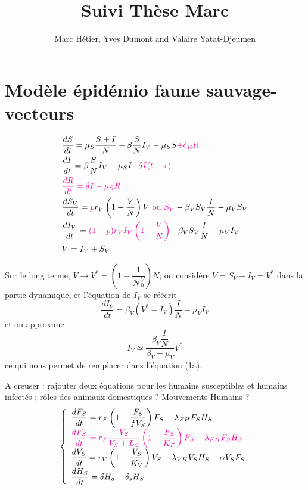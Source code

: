 \documentclass{article}
\title{Suivi Thèse Marc}
\author{Marc Hétier, Yves Dumont  and Valaire Yatat-Djeumen}
\newcommand{\marc}{\textcolor{magenta}}
\newcommand{\lf}{\lambda_{FH}}
\newcommand{\lv}{\lambda_{VH}}
\begin{document}
\maketitle

\section{Modèle épidémio faune sauvage-vecteurs}
\begin{subequations}
\begin{align}
&\dfrac{dS}{dt} = \mu_S \dfrac{S+I}{N} - \beta \dfrac{S}{N}I_V - \mu_S S \marc{+ \delta_R R}\\
&\dfrac{dI}{dt} = \beta \dfrac{S}{N}I_V - \mu_S I \marc{-\delta I(t-\tau)} \\
&\marc{\dfrac{dR}{dt} = \delta I - \mu_S R} \\
&\dfrac{dS_V}{dt} = \marc{p} r_V \left(1 - \dfrac{V}{N}\right)V \marc{\text{ ou } S_V} - \beta_V S_V \dfrac{I}{N} - \mu_V S_V \\
&\dfrac{dI_V}{dt} = \marc{(1-p) r_V I_V \left(1-\dfrac{V}{N} \right) + } \beta_V S_V \dfrac{I}{N} - \mu_V I_V \\
& V = I_V + S_V
\end{align}
\end{subequations}

Sur le long terme, $V \rightarrow V^* = (1-\dfrac{1}{\mathcal{N}_0^V}) N$; on considère $V = S_V + I_V = V^*$ dans la partie dynamique, et l'équation de $I_V$ se réécrit
\begin{equation}
\dfrac{dI_V}{dt} = \beta_V (V^* - I_V) \dfrac{I}{N} - \mu_V I_V
\end{equation}
et on approxime
\begin{equation}
I_V \simeq \dfrac{\beta_V \dfrac{I}{N}}{\beta_V + \mu_V}V^*
\end{equation}
ce qui nous permet de remplacer dans l'équation (1a).

A creuser : rajouter deux équations pour les humains susceptibles et humains infectés ; rôles des animaux domestiques ?
Mouvements Humains ?
\begin{equation}    
\left\{ \begin{array}{l}
\dfrac{dF_S}{dt}=r_{F}\left(1-\dfrac{F_S}{f V_S}\right)F_S -\lf F_S  H_S \\
\marc{\dfrac{dF_S}{dt}=r_{F}\dfrac{V_S}{V_S + L_S}\left(1-\dfrac{F_S}{K_F}\right)F_S -\lf F_S  H_S} \\
\dfrac{dV_S}{dt}=r_V \left(1-\dfrac{V_S}{K_{V}}\right)V_S  -\lv V_S H_S - \alpha V_S F_S\\
\dfrac{dH_S}{dt}= \delta H_a - \delta_s H_S \\
\end{array}\right.
\label{model:simplified}
\end{equation}
\end{document}
